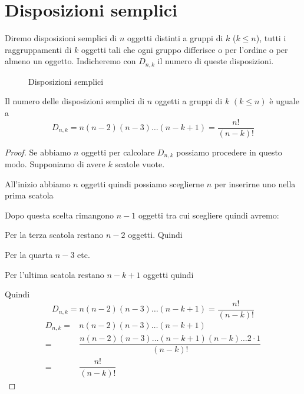 \section{Disposizioni semplici}
\begin{defn}
Diremo disposizioni semplici di $n$ oggetti distinti a gruppi di $k$ ($ k\leqslant n$), tutti i raggruppamenti di $k$ oggetti tali che ogni gruppo differisce o per l'ordine o per almeno un oggetto. Indicheremo con $D_{n,k}$ il numero di queste disposizioni.
\end{defn}
\begin{figure}
	\centering
	
	\caption{Disposizioni semplici}
	\label{fig:dispsemplici}
\end{figure}
\begin{thm}
	Il numero delle disposizioni semplici di $n$ oggetti a gruppi di $k$ $(k\leqslant n)$ è uguale a
	\[D_{n,k}=n(n-2)(n-3)\dots(n-k+1)=\dfrac{n!}{(n-k)!}\]
\end{thm}
\begin{proof}
	Se abbiamo $n$ oggetti per calcolare $D_{n,k}$  possiamo procedere in questo modo. Supponiamo di avere $k$ scatole vuote.\par 
	\makebox[\linewidth]{\scatola{}\scatola{}\scatola{}\scatola{},\dots,\scatola{}}\par
	All'inizio abbiamo $n$ oggetti quindi possiamo sceglierne $n$ per inserirne uno nella prima scatola\par 
	\par
	Dopo questa scelta rimangono $n-1$ oggetti tra cui scegliere quindi avremo:\par 
	\par
	Per la terza scatola restano $n-2$ oggetti. Quindi\par 
	\par
	Per la quarta $n-3$ etc.\par {}\par Per l'ultima scatola restano $n-k+1$ oggetti  quindi \par {}\par Quindi \[D_{n,k}=n(n-2)(n-3)\dots(n-k+1)=\dfrac{n!}{(n-k)!}\]
	\begin{align*}
	D_{n,k}=&n(n-2)(n-3)\dots(n-k+1)\\
	=&\dfrac{n(n-2)(n-3)\dots(n-k+1)(n-k)\dots 2\cdot 1}{(n-k)!}\\
	=&\dfrac{n!}{(n-k)!}
	\end{align*}
\end{proof}
